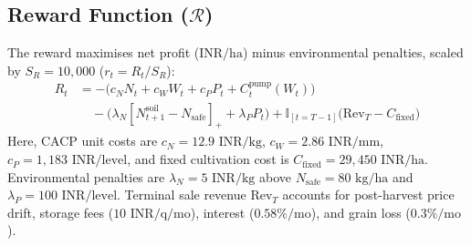 \documentclass[10pt,twocolumn]{article}
\begin{document}
\subsection{Reward Function (\texorpdfstring{$\mathcal{R}$}{R})}
The reward maximises net profit ($\text{INR/ha}$) minus environmental penalties, scaled by $S_R = 10{,}000$ ($r_t = R_t / S_R$):
\begin{align}
R_t &= -\big(c_N N_t + c_W W_t + c_P P_t + C^{\text{pump}}_t(W_t)\big) \nonumber\\
&\quad -\big(\lambda_N [N^{\text{soil}}_{t+1} - N_{\text{safe}}]_+ + \lambda_P P_t\big) + \mathbb{I}_{[t = T-1]}\big(\text{Rev}_T - C_{\text{fixed}}\big)
\end{align}
Here, CACP unit costs are $c_N = 12.9\text{ INR/kg}$, $c_W = 2.86\text{ INR/mm}$, $c_P = 1{,}183\text{ INR/level}$, and fixed cultivation cost is $C_{\text{fixed}} = 29{,}450\text{ INR/ha}$. Environmental penalties are $\lambda_N = 5\text{ INR/kg}$ above $N_{\text{safe}} = 80\text{ kg/ha}$ and $\lambda_P = 100\text{ INR/level}$. Terminal sale revenue $\text{Rev}_T$ accounts for post-harvest price drift, storage fees ($10\text{ INR/q/mo}$), interest ($0.58\%/\text{mo}$), and grain loss ($0.3\%/\text{mo}$).
\end{document}
